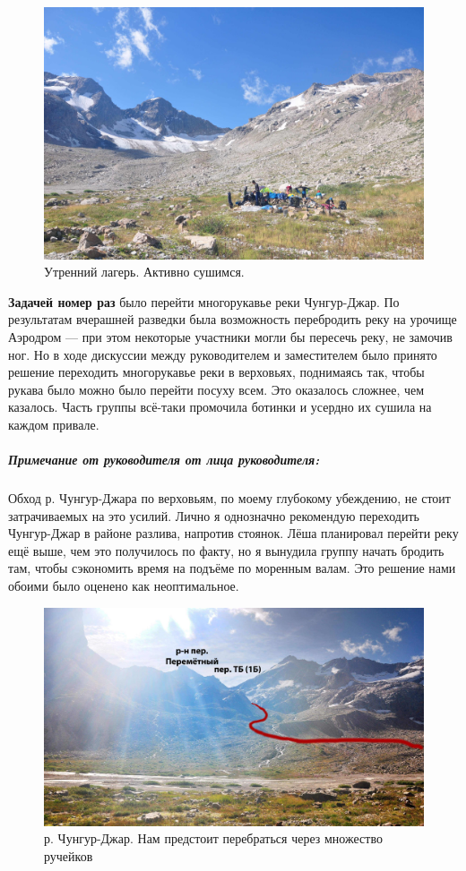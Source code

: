 \begin{figure}[h!]
	\centering
	\includegraphics[width=0.7\linewidth]{../pics/DSC_0251.jpg}
	\caption{Утренний лагерь. Активно сушимся.}
	\label{fig:DSC_0251}
\end{figure}

\textbf{Задачей номер раз} было перейти многорукавье реки Чунгур-Джар. По результатам вчерашней разведки была возможность перебродить реку на урочище Аэродром --- при этом некоторые участники могли бы пересечь реку, не замочив ног. Но в ходе дискуссии между руководителем и заместителем было принято решение переходить многорукавье реки в верховьях, поднимаясь так, чтобы рукава было можно было перейти посуху всем. Это оказалось сложнее, чем казалось. Часть группы всё-таки промочила ботинки и усердно их сушила на каждом привале. 

\subparagraph{Примечание от руководителя от лица руководителя:} Обход р. Чунгур-Джара по верховьям, по моему глубокому убеждению, не стоит затрачиваемых на это усилий. Лично я однозначно рекомендую переходить Чунгур-Джар в районе разлива, напротив стоянок. Лёша планировал перейти реку ещё выше, чем это получилось по факту, но я вынудила группу начать бродить там, чтобы сэкономить время на подъёме по моренным валам. Это решение нами обоими было оценено как неоптимальное. 


\begin{figure}[h!]
	\centering
	\includegraphics[width=0.7\linewidth]{../pics/DSC_0254.jpg}
	\caption{р. Чунгур-Джар. Нам предстоит перебраться через множество ручейков}
	\label{fig:DSC_0254}
\end{figure}

